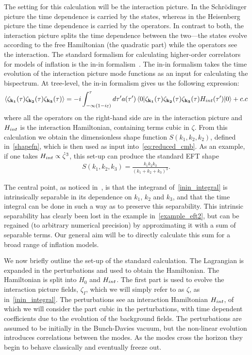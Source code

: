 The setting for this calculation will be the interaction picture. In the Schr\"{o}dinger
picture the time dependence is carried by the states, whereas in the Heisenberg picture
the time dependence is carried by the operators. In contrast to both,
the interaction picture splits the time dependence between the two---the states evolve according
to the free Hamiltonian (the quadratic part) while the operators see the interaction.
The standard formalism for calculating
higher-order correlators for models of inflation is the in-in formalism~\cite{Maldacena,weinberg_in_in}.
The in-in formalism takes the time evolution of the interaction picture mode
functions as an input for calculating the bispectrum.
At tree-level, the in-in formalism gives us the
following expression:
\begin{align}\label{inin_integral}
{
    \left< \zeta_{\mathbf{k_1}}(\tau)\zeta_{\mathbf{k_2}}(\tau)\zeta_{\mathbf{k_3}}(\tau) \right>
=-i\int_{-\infty(1-i\varepsilon)}^{\tau}d\tau'a(\tau')
    \left<0\lvert \zeta_{\mathbf{k_1}}(\tau)\zeta_{\mathbf{k_2}}(\tau)\zeta_{\mathbf{k_3}}(\tau)H_{int}(\tau') \rvert0\right>+c.c
}
\end{align}
where all the operators on the right-hand side are in the interaction picture
and $H_{int}$ is the interaction Hamiltonian, containing terms cubic in $\zeta$.
From this calculation we obtain the dimensionless shape function $S(k_1,k_2,k_2)$,
defined in~\eqref{shapefn},
which is then used as input into~\eqref{eq:reduced_cmb}.
As an example, if one takes $H_{int}\propto\dot{\zeta}^3$, this set-up can produce the standard EFT shape
\begin{align}\label{example_eft2}
    S(k_1, k_2, k_3) = \frac{k_1k_2k_3}{(k_1+k_2+k_3)^3}.
\end{align}

The central point, as noticed in~\cite{Funakoshi}, is that the
integrand of~\eqref{inin_integral} is intrinsically separable
in its dependence on $k_1$, $k_2$ and $k_3$, and that the time integral
can be done in such a way as to preserve this separability.
This intrinsic separability has clearly been lost in
the example in~\eqref{example_eft2},
but can be regained (to arbitrary numerical precision) by approximating it
with a sum of separable terms. Our general aim will be to directly calculate
this sum for a broad range of inflation models.


We now briefly outline the set-up of the standard calculation.
The Lagrangian is expanded in the perturbations and used to obtain the Hamiltonian.
The Hamiltonian is split into $H_0$ and $H_{int}$.
The first part is used to evolve the interaction picture fields, $\zeta_I$,
which we will simply refer to as $\zeta$, as in~\eqref{inin_integral}.
The perturbations see an interaction Hamiltonian $H_{int}$,
of which we will consider the part cubic in the perturbations,
with time dependent coefficients due to the evolution of the background fields.
The perturbations are assumed to be initially in the Bunch-Davies vacuum,
but the non-linear
evolution introduces correlations between the modes.
As the modes cross the horizon they begin to behave classically
and eventually freeze out.


